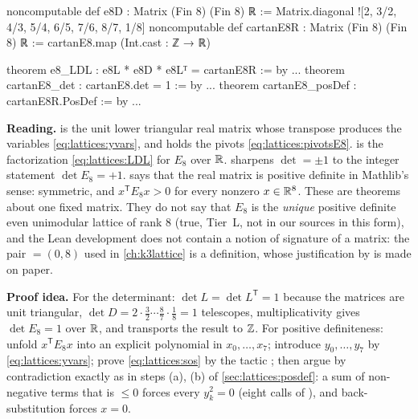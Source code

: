 \begin{leanbox}[$\det E_8=1$ and positive definiteness (\lean{E8PosDef.lean})]
\begin{leancode}
noncomputable def e8D : Matrix (Fin 8) (Fin 8) ℝ :=
  Matrix.diagonal ![2, 3/2, 4/3, 5/4, 6/5, 7/6, 8/7, 1/8]
noncomputable def cartanE8R : Matrix (Fin 8) (Fin 8) ℝ :=
  cartanE8.map (Int.cast : ℤ → ℝ)

theorem e8_LDL : e8L * e8D * e8Lᵀ = cartanE8R := by ...
theorem cartanE8_det : cartanE8.det = 1 := by ...
theorem cartanE8_posDef : cartanE8R.PosDef := by ...
\end{leancode}
\textbf{Reading.}  is the unit lower triangular real matrix whose transpose
produces the variables \eqref{eq:lattices:yvars}, and  holds the pivots
\eqref{eq:lattices:pivotsE8}.  is the factorization \eqref{eq:lattices:LDL}
for $E_8$ over $\mathbb{R}$.  sharpens $\det=\pm1$ to the integer statement
$\det E_8=+1$.  says that the real matrix is positive definite in
Mathlib's sense: symmetric, and $x^{\mathsf T}E_8x>0$ for every nonzero $x\in\mathbb{R}^8$. These are
theorems about one fixed matrix. They do not say that $E_8$ is the \emph{unique} positive
definite even unimodular lattice of rank $8$ (true, Tier~L, not in our sources in this form),
and the Lean development does not contain a notion of signature of a matrix: the pair
${}=(0,8)$ used in \cref{ch:k3lattice} is a definition, whose justification by
 is made on paper.

\textbf{Proof idea.} For the determinant: $\det L=\det L^{\mathsf T}=1$ because the matrices
are unit triangular, $\det D=2\cdot\frac32\cdots\frac87\cdot\frac18=1$ telescopes,
multiplicativity gives $\det E_8=1$ over $\mathbb{R}$, and  transports the result
to $\mathbb{Z}$. For positive definiteness: unfold $x^{\mathsf T}E_8x$ into an explicit polynomial in
$x_0,\dots,x_7$; introduce $y_0,\dots,y_7$ by \eqref{eq:lattices:yvars}; prove
\eqref{eq:lattices:sos} by the tactic ; then argue by contradiction exactly as in
steps (a), (b) of \cref{sec:lattices:posdef}: a sum of non-negative terms that is $\le0$
forces every $y_k^2=0$ (eight calls of ), and back-substitution forces $x=0$.
\end{leanbox}

